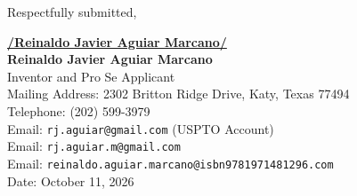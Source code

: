 \documentclass[11pt,letterpaper]{article}
\begin{document}
\vspace{0.6cm}
\begin{singlespace}
\noindent Respectfully submitted, \par\vspace{0.8cm}
\underline{\textbf{/Reinaldo Javier Aguiar Marcano/}} \\
\textbf{Reinaldo Javier Aguiar Marcano} \\
Inventor and Pro Se Applicant \\
Mailing Address: 2302 Britton Ridge Drive, Katy, Texas 77494 \\
Telephone: (202) 599-3979 \\
Email: \texttt{rj.aguiar@gmail.com} (USPTO Account) \\
Email: \texttt{rj.aguiar.m@gmail.com} \\
Email: \texttt{reinaldo.aguiar.marcano@isbn9781971481296.com} \\
Date: October 11, 2026
\end{singlespace}
\end{document}
